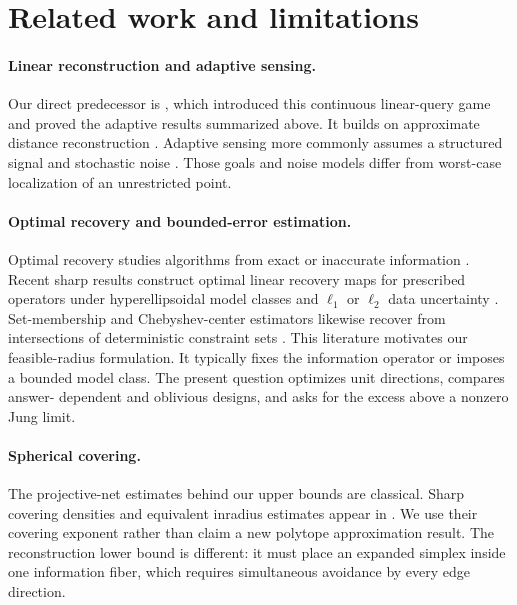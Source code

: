 \documentclass{article}
\theoremstyle{definition}
\begin{document}
\section{Related work and limitations}                              \label{sec:related}

\paragraph{Linear reconstruction and adaptive sensing.}
Our direct predecessor is \citet{filmus2026optimal}, which introduced this continuous linear-query game and proved the adaptive results summarized above. It builds on approximate distance reconstruction \citep{moran2025reconstruction}.  Adaptive sensing more commonly assumes a structured signal and stochastic noise \citep{ariascatro2013fundamental}.  Those goals and noise models differ from worst-case localization of an unrestricted point.

\paragraph{Optimal recovery and bounded-error estimation.}
Optimal recovery studies algorithms from exact or inaccurate information \citep{traub1988information,osipenko2019generalized}.  Recent sharp results construct optimal linear recovery maps for prescribed operators under hyperellipsoidal model classes and $\ell_1$ or $\ell_2$ data uncertainty \citep{foucart2024radius}.  Set-membership and Chebyshev-center estimators likewise recover from intersections of deterministic constraint sets \citep{eldar2008minimax}.  This literature motivates our feasible-radius formulation.  It typically fixes the information operator or imposes a bounded model class.  The present question optimizes unit directions, compares answer- dependent and oblivious designs, and asks for the excess above a nonzero Jung limit.

\paragraph{Spherical covering.}
The projective-net estimates behind our upper bounds are classical.  Sharp covering densities and equivalent inradius estimates appear in \citet{boroczky2003covering,dumer2007covering,barany1988approximation,barany2005note}.  We use their covering exponent rather than claim a new polytope approximation result. The reconstruction lower bound is different: it must place an expanded simplex inside one information fiber, which requires simultaneous avoidance by every edge direction.
\end{document}
